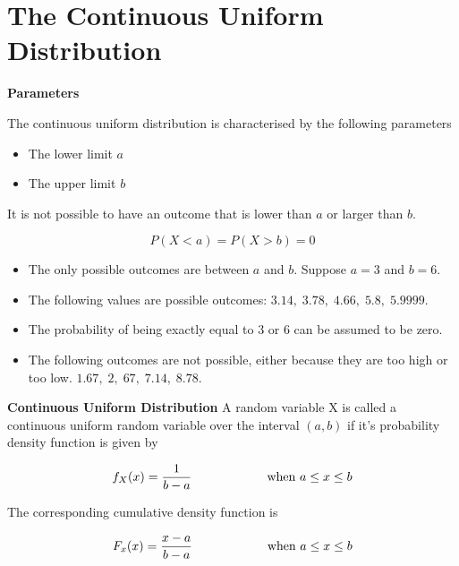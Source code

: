 

\section{The Continuous Uniform Distribution}
{
\textbf{Parameters}
\Large

The continuous uniform distribution is characterised by the following parameters

\begin{itemize}
\item The lower limit $a$
\item The upper limit $b$
\end{itemize}

It is not possible to have an outcome that is lower than $a$ or larger than $b$.

\[ P(X < a) = P(X > b) = 0\]
}

{
\Large
\begin{itemize}
\item The only possible outcomes are between $a$ and $b$. Suppose $a = 3$ and $b = 6$.\bigskip
\item The following values are possible outcomes: $3.14, \;3.78,\; 4.66,\; 5.8,\;5.9999.$ \bigskip
\item The probability of being exactly equal to $3$ or $6$ can be assumed to be zero. \bigskip
\item The following outcomes are not possible, either because they are too high or too low.
$1.67,\;2,\;67,\;7.14,\; 8.78.$
\end{itemize}
}

{
	\textbf{Continuous Uniform Distribution}
	A random variable X is called a continuous uniform random variable over the interval $(a,b)$ if it's probability density function is given by
	
	\[ f_{X}(x)  =  { 1 \over b-a}   \hspace{2cm}  \mbox{ when } a \leq x \leq b\]
	
	The corresponding cumulative density function is
	
	\[ F_x(x) = { x-a \over b-a}   \hspace{2cm}  \mbox{ when } a \leq x \leq b\]
	
}

